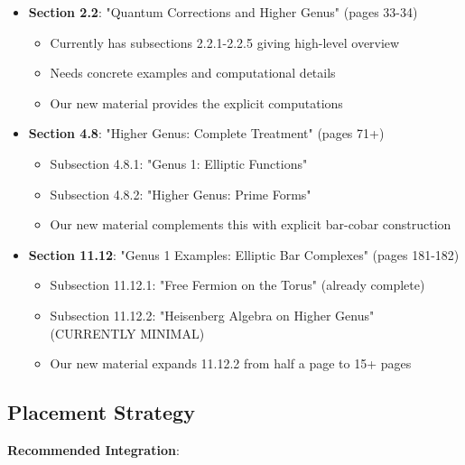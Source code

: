\begin{itemize}
\item \textbf{Section 2.2}: "Quantum Corrections and Higher Genus" (pages 33-34)
  \begin{itemize}
  \item Currently has subsections 2.2.1-2.2.5 giving high-level overview
  \item Needs concrete examples and computational details
  \item Our new material provides the explicit computations
  \end{itemize}

\item \textbf{Section 4.8}: "Higher Genus: Complete Treatment" (pages 71+)
  \begin{itemize}
  \item Subsection 4.8.1: "Genus 1: Elliptic Functions"
  \item Subsection 4.8.2: "Higher Genus: Prime Forms"
  \item Our new material complements this with explicit bar-cobar construction
  \end{itemize}

\item \textbf{Section 11.12}: "Genus 1 Examples: Elliptic Bar Complexes" (pages 181-182)
  \begin{itemize}
  \item Subsection 11.12.1: "Free Fermion on the Torus" (already complete)
  \item Subsection 11.12.2: "Heisenberg Algebra on Higher Genus" (CURRENTLY MINIMAL)
  \item Our new material expands 11.12.2 from half a page to 15+ pages
  \end{itemize}
\end{itemize}

\subsection{Placement Strategy}

\textbf{Recommended Integration}:

